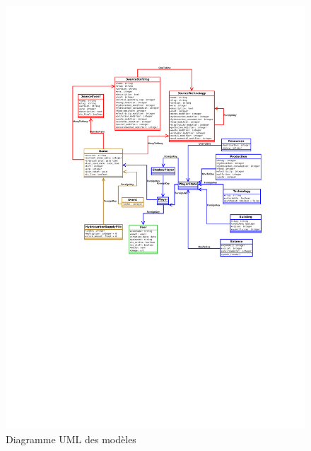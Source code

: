 \documentclass[12pt,twoside,a4paper]{article}
\begin{document}
\begin{figure}[H]
\centering
\includegraphics[width=16cm]{../global_uml.pdf}
\caption{Diagramme UML des mod\`eles}
\end{figure}
\end{document}
